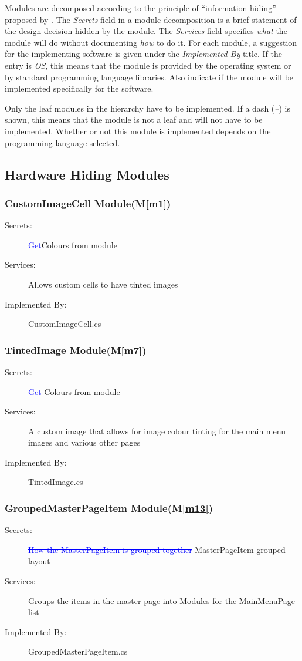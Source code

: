 \documentclass[12pt, titlepage]{article}
\newcommand{\mref}[1]{M\ref{#1}}
\begin{document}
Modules are decomposed according to the principle of ``information hiding''
proposed by \citet{ParnasEtAl1984}. The \emph{Secrets} field in a module
decomposition is a brief statement of the design decision hidden by the
module. The \emph{Services} field specifies \emph{what} the module will do
without documenting \emph{how} to do it. For each module, a suggestion for the
implementing software is given under the \emph{Implemented By} title. If the
entry is \emph{OS}, this means that the module is provided by the operating
system or by standard programming language libraries.  Also indicate if the
module will be implemented specifically for the software.

Only the leaf modules in the
hierarchy have to be implemented. If a dash (\emph{--}) is shown, this means
that the module is not a leaf and will not have to be implemented. Whether or
not this module is implemented depends on the programming language
selected.

\subsection{Hardware Hiding Modules}
\subsubsection{CustomImageCell Module(\mref{m1})}
\begin{description}
\item[Secrets:] \textcolor{blue}{\st{Get}}Colours from module
\item[Services:]Allows custom cells to have tinted images
\item[Implemented By:] CustomImageCell.cs
\end{description}

\subsubsection{TintedImage Module(\mref{m7})}
\begin{description}
\item[Secrets:]\textcolor{blue}{\st{Get}} Colours from module
\item[Services:]A custom image that allows for image colour tinting for the main menu images and various other pages
\item[Implemented By:] TintedImage.cs
\end{description}

\subsubsection{GroupedMasterPageItem Module(\mref{m13})}
\begin{description}
\item[Secrets:] \textcolor{blue}{\st{How the MasterPageItem is grouped together}} MasterPageItem grouped layout
\item[Services:]Groups the items in the master page into Modules for the MainMenuPage list
\item[Implemented By:] GroupedMasterPageItem.cs
\end{description}
\end{document}
